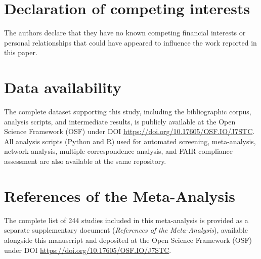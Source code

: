 \documentclass[lineno,pdflatex,sn-apa]{sn-jnl}
\begin{document}
\section*{Declaration of competing interests}

The authors declare that they have no known competing financial interests or personal relationships that could have appeared to influence the work reported in this paper.

\section*{Data availability}

The complete dataset supporting this study, including the bibliographic corpus, analysis scripts, and intermediate results, is publicly available at the Open Science Framework (OSF) under DOI \url{https://doi.org/10.17605/OSF.IO/J7STC}. All analysis scripts (Python and R) used for automated screening, meta-analysis, network analysis, multiple correspondence analysis, and FAIR compliance assessment are also available at the same repository.



\section*{References of the Meta-Analysis}

The complete list of 244 studies included in this meta-analysis is provided as a separate supplementary document (\textit{References of the Meta-Analysis}), available alongside this manuscript and deposited at the Open Science Framework (OSF) under DOI \url{https://doi.org/10.17605/OSF.IO/J7STC}.
\end{document}
